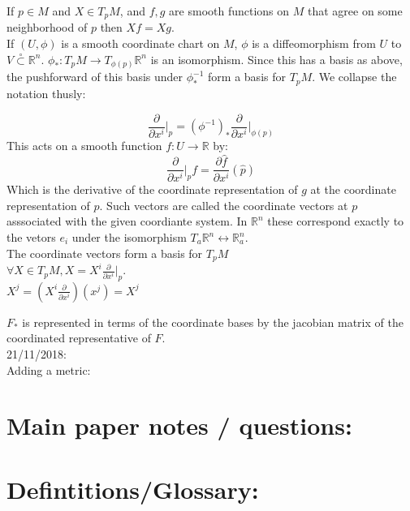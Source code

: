 \documentclass[14pt, twocolumn]{article}
\newcommand{\opsubset}{\overset{\circ}{\subset}}
\newcommand{\R}{\mathbb{R}}
\newcommand{\pder}[2]{\frac{\partial#1}{\partial#2}}
\newcommand{\cv}[1]{\pder{}{x^#1}}
\begin{document}
	If $p \in M$ and $X \in T_pM$, and $f,g$ are smooth functions on $M$ that agree on some neighborhood of $p$ then $Xf = Xg$.\\

	If $(U,\phi)$ is a smooth coordinate chart on $M$, $\phi$ is a diffeomorphism from $U$ to $V \opsubset \R^n$. $\phi_* : T_pM \to T_{\phi(p)}\R^n$ is an isomorphism. Since this has a basis as above, the pushforward of this basis under $\phi^{-1}_*$ form a basis for $T_pM$. We collapse the notation thusly:

	$$\pder{}{x^i}\Bigg|_p = (\phi^{-1})_* \pder{}{x^i} \Bigg|_{\phi(p)}$$
	This acts on a smooth function $f: U \to \R$ by:
	$$\pder{}{x^i}\Bigg|_p f = \pder{\hat{f}}{x^i}(\hat{p})$$
	Which is the derivative of the coordinate representation of $g$ at the coordinate representation of $p$. Such vectors are called the coordinate vectors at $p$ asssociated with the given coordiante system. In $\R^n$ these correspond exactly to the vetors $e_i$ under the isomorphism $T_a\R^n \leftrightarrow \R_a^n$.\\

	The coordinate vectors form a basis for $T_pM$\\
	$\forall X \in T_pM, X = X^i \cv{i}\big|_p$.\\
	$X^j = (X^i \cv{i})(x^j) = X^j$

	$F_*$ is represented in terms of the coordinate bases by the jacobian matrix of the coordinated representative of $F.$\\

	21/11/2018:\\
	Adding a metric:\\

	\section*{Main paper notes / questions:}

	



	


	\section*{Defintitions/Glossary:}


	
\end{document}
